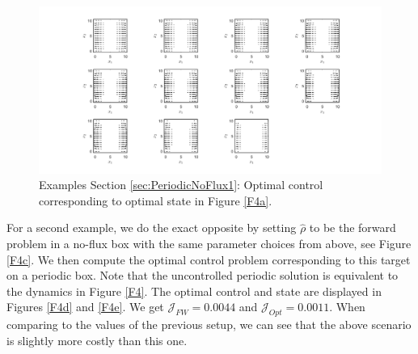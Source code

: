 \documentclass[11pt, a4paper]{article}
\theoremstyle{definition}
\newcommand{\hr}{\widehat \rho}
\begin{document}
\begin{figure}[h]
	\centering
	\includegraphics[scale=0.35]{ConOptPeri1.png}
	\caption{Examples Section \ref{sec:PeriodicNoFlux1}: Optimal control corresponding to optimal state in Figure \ref{F4a}.} 
	\label{F4b}
\end{figure}

For a second example, we do the exact opposite by setting $\hr$ to be the forward problem in a no-flux box with the same parameter choices from above, see Figure \ref{F4c}. We then compute the optimal control problem corresponding to this target on a periodic box. Note that the uncontrolled periodic solution is equivalent to the dynamics in Figure \ref{F4}. The optimal control and state are displayed in Figures \ref{F4d} and \ref{F4e}. We get $\mathcal J_{FW} =  0.0044$ and $\mathcal J_{Opt} = 0.0011$. When comparing to the values of the previous setup, we can see that the above scenario is slightly more costly than this one.
\end{document}
